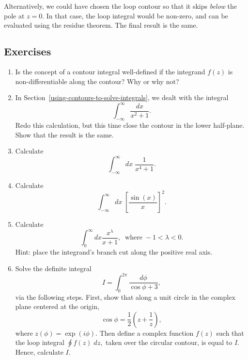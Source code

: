 \documentclass[10pt,a4paper]{article}
\begin{document}
Alternatively, we could have chosen the loop contour so that it skips
\emph{below} the pole at $z = 0$. In that case, the loop integral
would be non-zero, and can be evaluated using the residue theorem. The
final result is the same.

\subsection{Exercises}
\label{exercises}

\begin{enumerate}
\item
  Is the concept of a contour integral well-defined if the integrand
  $f(z)$ is non-differentiable along the contour? Why or why not?

\item
  In Section~\ref{using-contours-to-solve-integrals}, we dealt with
  the integral
  \begin{equation}
    \int_{-\infty}^\infty \frac{dx}{x^2 + 1}.
  \end{equation}
  Redo this calculation, but this time close the contour in the lower
  half-plane.  Show that the result is the same.

\item
  Calculate
  \begin{equation}
    \int_{-\infty}^\infty dx\; \frac{1}{x^4 + 1}.
  \end{equation}

\item
  Calculate
  \begin{equation}
    \int_{-\infty}^\infty dx\; \left[\frac{\sin(x)}{x}\right]^2.
  \end{equation}

\item
  Calculate
  \begin{equation}
    \int_0^\infty dx \frac{x^{\lambda}}{x+1}, \;\;\mathrm{where}\; -1 < \lambda < 0.
  \end{equation}
  Hint: place the integrand's branch cut along the positive real axis.

\item
  Solve the definite integral
  \begin{equation}
    I = \int_0^{2\pi} \frac{d\phi}{\cos\phi+3},
  \end{equation}
  via the following steps. First, show that along a unit circle in the
  complex plane centered at the origin,
  \begin{equation}
    \cos\phi = \frac{1}{2}\left(z+\frac{1}{z}\right),
  \end{equation}
  where $z(\phi) = \exp(i\phi)$. Then define a complex function $f(z)$
  such that the loop integral $\oint f(z) \;dz,$ taken over the
  circular contour, is equal to $I$. Hence, calculate
  $I$.
  

\end{enumerate}
\end{document}
